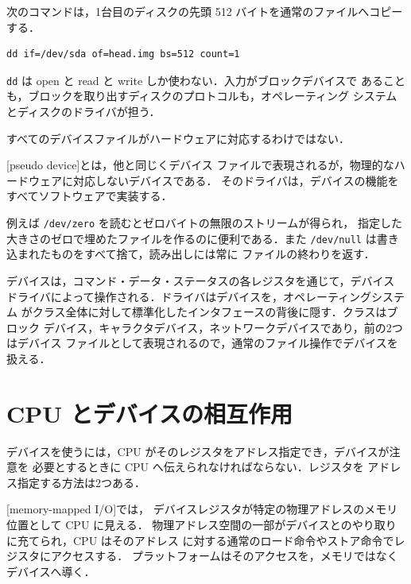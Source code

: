 \documentclass[../main.tex]{subfiles}
\begin{document}
\begin{example}
  次のコマンドは，1台目のディスクの先頭 512 バイトを通常のファイルへコピー
  する．
  \begin{lstlisting}[numbers=none]
dd if=/dev/sda of=head.img bs=512 count=1
\end{lstlisting}
  \texttt{dd} は open と read と write しか使わない．入力がブロックデバイスで
  あることも，ブロックを取り出すディスクのプロトコルも，オペレーティング
  システムとディスクのドライバが担う．
\end{example}

すべてのデバイスファイルがハードウェアに対応するわけではない．

\begin{definition}[疑似デバイス]
  [pseudo device]とは，他と同じくデバイス
  ファイルで表現されるが，物理的なハードウェアに対応しないデバイスである．
  そのドライバは，デバイスの機能をすべてソフトウェアで実装する．
\end{definition}

例えば \texttt{/dev/zero} を読むとゼロバイトの無限のストリームが得られ，
指定した大きさのゼロで埋めたファイルを作るのに便利である．また
\texttt{/dev/null} は書き込まれたものをすべて捨て，読み出しには常に
ファイルの終わりを返す．

\begin{keypoint}
  デバイスは，コマンド・データ・ステータスの各レジスタを通じて，デバイス
  ドライバによって操作される．ドライバはデバイスを，オペレーティングシステム
  がクラス全体に対して標準化したインタフェースの背後に隠す．クラスはブロック
  デバイス，キャラクタデバイス，ネットワークデバイスであり，前の2つはデバイス
  ファイルとして表現されるので，通常のファイル操作でデバイスを扱える．
\end{keypoint}

\section{CPU とデバイスの相互作用}
\label{sec:l11-interactions}

デバイスを使うには，CPU がそのレジスタをアドレス指定でき，デバイスが注意を
必要とするときに CPU へ伝えられなければならない．レジスタを
アドレス指定する方法は2つある．

\begin{definition}[メモリマップド I/O]
  [memory-mapped I/O]では，
  デバイスレジスタが特定の物理アドレスのメモリ位置として CPU に見える．
  物理アドレス空間の一部がデバイスとのやり取りに充てられ，CPU はそのアドレス
  に対する通常のロード命令やストア命令でレジスタにアクセスする．
  プラットフォームはそのアクセスを，メモリではなくデバイスへ導く．%
\end{definition}
\end{document}
